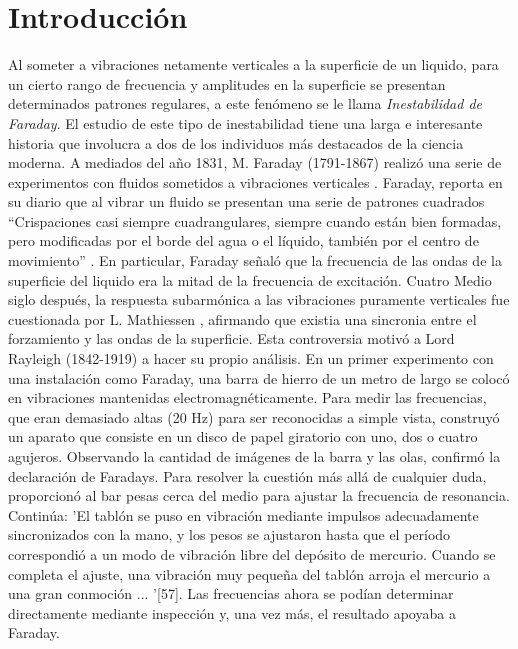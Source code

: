 \chapter*{Introducción}

Al someter a vibraciones netamente verticales a la superficie de un liquido, para un cierto rango de frecuencia y amplitudes en la superficie se presentan determinados patrones regulares, a este fenómeno se le llama \textit{Inestabilidad de Faraday}. El estudio de este tipo de inestabilidad tiene una larga e interesante historia que involucra a dos de los individuos más destacados de la ciencia moderna. A mediados del año 1831, M. Faraday (1791-1867) realizó una serie de experimentos con fluidos sometidos a vibraciones verticales \cite{Faraday1831}. Faraday, reporta en su diario que al vibrar un fluido se presentan una serie de patrones cuadrados ``Crispaciones casi siempre cuadrangulares, siempre cuando están bien formadas, pero modificadas por el borde del agua o el líquido, también por el centro de movimiento'' \cite{Faraday2008}. En particular, Faraday señaló que la frecuencia de las ondas de la superficie del liquido era la mitad de la frecuencia de excitación. Cuatro Medio siglo después, la respuesta subarmónica a las vibraciones puramente verticales fue cuestionada por L. Mathiessen \cite{Matthiessen1868}, afirmando que existia una sincronia entre el forzamiento y las ondas de la superficie. Esta controversia motivó a Lord Rayleigh (1842-1919) a hacer su propio análisis. En un primer experimento con una instalación como Faraday, una barra de hierro de un metro de largo se colocó en vibraciones mantenidas electromagnéticamente. Para medir las frecuencias, que eran demasiado altas (20 Hz) para ser reconocidas a simple vista, construyó un aparato que consiste en un disco de papel giratorio con uno, dos o cuatro agujeros. Observando la cantidad de imágenes de la barra y las olas, confirmó la declaración de Faradays. Para resolver la cuestión más allá de cualquier duda, proporcionó al bar pesas cerca del medio para ajustar la frecuencia de resonancia. Continúa: 'El tablón se puso en vibración mediante impulsos adecuadamente sincronizados con la mano, y los pesos se ajustaron hasta que el período correspondió a un modo de vibración libre del depósito de mercurio. Cuando se completa el ajuste, una vibración muy pequeña del tablón arroja el mercurio a una gran conmoción ... '[57]. Las frecuencias ahora se podían determinar directamente mediante inspección y, una vez más, el resultado apoyaba a Faraday.
